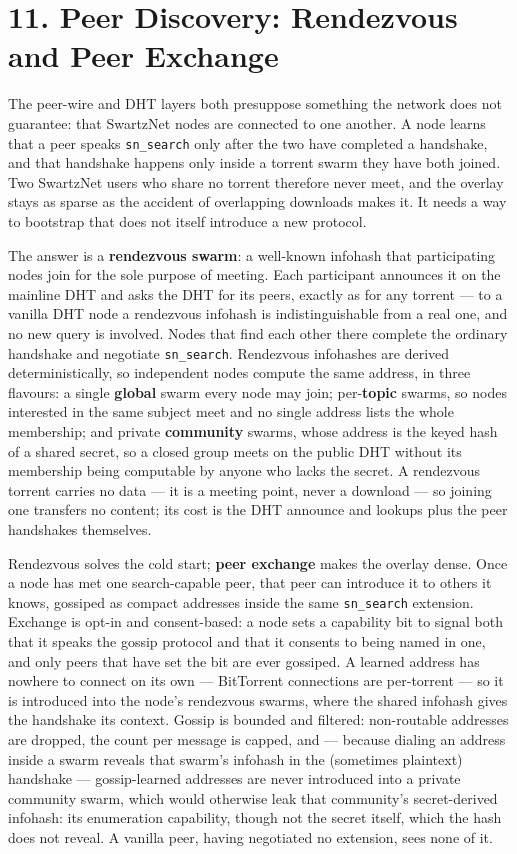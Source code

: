 \documentclass[11pt]{article}
\begin{document}
\hypertarget{peer-discovery-rendezvous-and-peer-exchange}{%
\section{11. Peer Discovery: Rendezvous and Peer
Exchange}\label{peer-discovery-rendezvous-and-peer-exchange}}

The peer-wire and DHT layers both presuppose something the network does
not guarantee: that SwartzNet nodes are connected to one another. A node
learns that a peer speaks \texttt{sn\_search} only after the two have
completed a handshake, and that handshake happens only inside a torrent
swarm they have both joined. Two SwartzNet users who share no torrent
therefore never meet, and the overlay stays as sparse as the accident of
overlapping downloads makes it. It needs a way to bootstrap that does
not itself introduce a new protocol.

The answer is a \textbf{rendezvous swarm}: a well-known infohash that
participating nodes join for the sole purpose of meeting. Each
participant announces it on the mainline DHT and asks the DHT for its
peers, exactly as for any torrent --- to a vanilla DHT node a rendezvous
infohash is indistinguishable from a real one, and no new query is
involved. Nodes that find each other there complete the ordinary
handshake and negotiate \texttt{sn\_search}. Rendezvous infohashes are
derived deterministically, so independent nodes compute the same
address, in three flavours: a single \textbf{global} swarm every node
may join; per-\textbf{topic} swarms, so nodes interested in the same
subject meet and no single address lists the whole membership; and
private \textbf{community} swarms, whose address is the keyed hash of a
shared secret, so a closed group meets on the public DHT without its
membership being computable by anyone who lacks the secret. A rendezvous
torrent carries no data --- it is a meeting point, never a download ---
so joining one transfers no content; its cost is the DHT announce and
lookups plus the peer handshakes themselves.

Rendezvous solves the cold start; \textbf{peer exchange} makes the
overlay dense. Once a node has met one search-capable peer, that peer
can introduce it to others it knows, gossiped as compact addresses
inside the same \texttt{sn\_search} extension. Exchange is opt-in and
consent-based: a node sets a capability bit to signal both that it
speaks the gossip protocol and that it consents to being named in one,
and only peers that have set the bit are ever gossiped. A learned
address has nowhere to connect on its own --- BitTorrent connections are
per-torrent --- so it is introduced into the node's rendezvous swarms,
where the shared infohash gives the handshake its context. Gossip is
bounded and filtered: non-routable addresses are dropped, the count per
message is capped, and --- because dialing an address inside a swarm
reveals that swarm's infohash in the (sometimes plaintext) handshake ---
gossip-learned addresses are never introduced into a private community
swarm, which would otherwise leak that community's secret-derived
infohash: its enumeration capability, though not the secret itself,
which the hash does not reveal. A vanilla peer, having negotiated no
extension, sees none of it.
\end{document}
